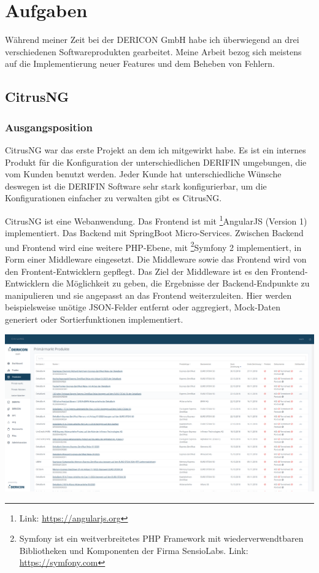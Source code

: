 \documentclass[chapterprefix=false, 12pt, a4paper, oneside, parskip=half, listof=totoc, bibliography=totoc, numbers=noendperiod]{scrbook}
\begin{document}
    \chapter{Aufgaben}

    Während meiner Zeit bei der DERICON GmbH habe ich überwiegend an drei verschiedenen Softwareprodukten gearbeitet.
    Meine Arbeit bezog sich meistens auf die Implementierung neuer Features und dem Beheben von Fehlern.

    \section{CitrusNG}

    \subsection{Ausgangsposition}

    CitrusNG war das erste Projekt an dem ich mitgewirkt habe. Es ist ein internes Produkt für die Konfiguration der unterschiedlichen DERIFIN umgebungen, die
    vom Kunden benutzt werden. Jeder Kunde hat unterschiedliche Wünsche deswegen ist die DERIFIN Software sehr stark konfigurierbar, um die Konfigurationen einfacher
    zu verwalten gibt es CitrusNG.

    \pagebreak

    CitrusNG ist eine Webanwendung. Das Frontend ist mit \footnote{Link: \url{https://angularjs.org}}AngularJS (Version 1) implementiert. Das Backend mit SpringBoot Micro-Services.
    Zwischen Backend und Frontend wird eine weitere PHP-Ebene, mit \footnote{Symfony ist ein weitverbreitetes PHP Framework mit wiederverwendtbaren Bibliotheken und Komponenten der Firma SensioLabs. Link: \url{https://symfony.com}}Symfony 2 implementiert, in Form einer Middleware eingesetzt.
    Die Middleware sowie das Frontend wird von den Frontent-Entwicklern gepflegt.
     Das Ziel der Middleware ist es den Frontend-Entwicklern die Möglichkeit zu geben, die Ergebnisse der
    Backend-Endpunkte zu manipulieren und sie angepasst an das Frontend weiterzuleiten. Hier werden beispielsweise unötige JSON-Felder entfernt oder
    aggregiert, Mock-Daten generiert oder Sortierfunktionen implementiert.

    \includegraphics[width=1.00\textwidth]{img/citrusng.png}
\end{document}
